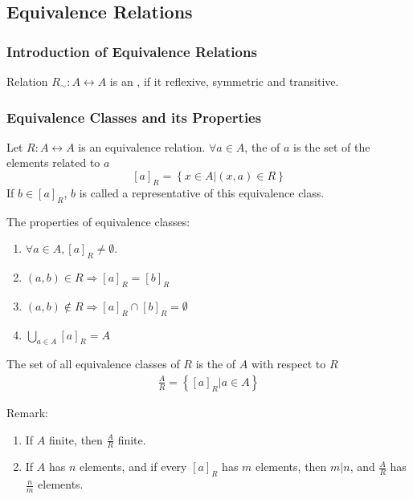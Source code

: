 \subsection{Equivalence Relations}
\subsubsection{Introduction of Equivalence Relations}
\begin{definition}
    Relation $R_{\sim}: A\leftrightarrow  A$ is an , if it reflexive, symmetric and transitive. 
\end{definition}

\subsubsection{Equivalence Classes and its Properties}
\begin{definition}
    Let $R: A \leftrightarrow A$ is an equivalence relation. $\forall a\in A$, the  of $a$ is the set of the elements related to $a$
    \[ [a]_R=\left\{ x\in A | (x,a)\in R \right\} \]
    If $b\in [a]_R$, $b$ is called a representative of this equivalence class. 
\end{definition}

The properties of equivalence classes:
\begin{enumerate}
    \item $\forall a\in A, [a]_R\ne \emptyset $.
    \item $(a,b)\in R \Rightarrow [a]_R=[b]_R$
    \item $(a,b)\notin R \Rightarrow [a]_R\cap[b]_R=\emptyset$
    \item $\displaystyle \bigcup_{a\in A} [a]_R=A$
\end{enumerate}

\begin{definition}
    The set of all equivalence classes of $R$ is the  of $A$ with respect to $R$
    \begin{align*}
        \frac{A}{R}=\left\{ [a]_R|a\in A \right\}
    \end{align*}
\end{definition}
Remark:
\begin{enumerate}
    \item If $A$ finite, then $\frac{A}{R}$ finite. 
    \item If $A$ has $n$ elements, and if every $[a]_R$ has $m$ elements, then $m|n$, and $\frac{A}{R}$ has $\frac{n}{m}$ elements. 
\end{enumerate}

